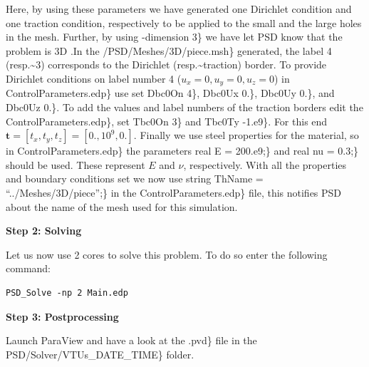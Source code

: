 Here, by using these parameters we have generated one Dirichlet
condition and one traction condition, respectively to be applied to the
small and the large holes in the mesh. Further, by using \psd -dimension
3\} we have let PSD know that the problem is 3D .In the
\psd /PSD/Meshes/3D/piece.msh\} generated, the label 4
(resp.\textasciitilde{}3) corresponds to the Dirichlet
(resp.\textasciitilde{}traction) border. To provide Dirichlet conditions
on label number 4 (\(u_x=0,u_y=0,u_z=0\)) in
\psd ControlParameters.edp\} use set \psd Dbc0On 4\}, \psd Dbc0Ux 0.\},
\psd Dbc0Uy 0.\}, and \psd Dbc0Uz 0.\}. To add the values and label
numbers of the traction borders edit the \psd ControlParameters.edp\},
set \psd Tbc0On 3\} and \psd Tbc0Ty -1.e9\}. For this end
\(\mathbf t=[t_x,t_y,t_z]=[0.,10^9,0.]\). Finally we use steel
properties for the material, so in \psd ControlParameters.edp\} the
parameters \psd real E = 200.e9;\} and \psd real nu = 0.3;\} should be
used. These represent \(E\) and \(\nu\), respectively. With all the
properties and boundary conditions set we now use \psd string ThName =
``../Meshes/3D/piece'';\} in the \psd ControlParameters.edp\} file, this
notifies PSD about the name of the mesh used for this simulation.

\textbf{Step 2: Solving}

Let us now use 2 cores to solve this problem. To do so enter the
following command:

\begin{lstlisting}[style=BashInputStyle]
PSD_Solve -np 2 Main.edp
\end{lstlisting}

\textbf{Step 3: Postprocessing}

Launch ParaView and have a look at the \psd .pvd\} file in the
\psd PSD/Solver/VTUs\_DATE\_TIME\} folder.

